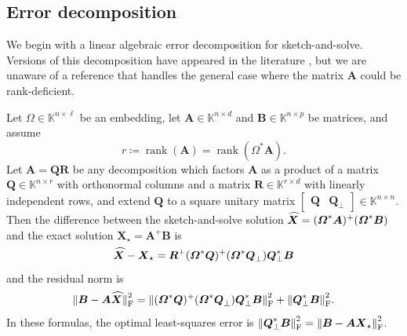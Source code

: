 \documentclass[11pt]{article}
\newcommand{\field}{\mathbb{K}}
\DeclareMathOperator{\rank}{rank}
\newcommand{\mat}[1]{\boldsymbol{#1}}
\newcommand{\norm}[1]{\mleft\| #1 \mright\|}
\newcommand{\hatbold}[1]{%
  \skew{4}\widehat{\smash{\boldsymbol{#1}}\mathstrut}}
\newcommand{\Xhat}{\smash{\hatbold{X}}}
\theoremstyle{definition}
\numberwithin{equation}{section}
\begin{document}
\subsection{Error decomposition} \label{sec:sketch-solve-formula}

We begin with a linear algebraic error decomposition for sketch-and-solve.
Versions of this decomposition have appeared in the literature \cite{TYUC17,CEMT25}, but we are unaware of a reference that handles the general case where the matrix $\mat{A}$ could be rank-deficient.

\begin{lemma} \label{lem:sketch-solve-formula}
    Let $\mat{\varOmega} \in \field^{n\times \ell}$ be an embedding, let $\mat{A} \in \field^{n\times d}$ and $\mat{B} \in \field^{n\times p}$ be matrices, and assume 
    \begin{equation*}
    r \coloneqq \rank(\mat{A}) = \rank(\mat{\varOmega}^* \mat{A}).
    \end{equation*}
    Let $\mat{A} = \mat{Q}\mat{R}$ be any decomposition which factors $\mat{A}$ as a product of a matrix $\mat{Q} \in \field^{n\times r}$ with orthonormal columns and a matrix $\mat{R} \in \field^{r\times d}$ with linearly independent rows, and extend $\mat{Q}$ to a square unitary matrix $[\begin{matrix} \mat{Q} & \mat{Q}_\perp \end{matrix}] \in \field^{n\times n}$.
    Then the difference between the sketch-and-solve solution $\Xhat = (\mat{\varOmega}^*\mat{A})^+(\mat{\varOmega}^*\mat{B})$ and the exact solution $\mat{X}_\star = \mat{A}^+\mat{B}$ is
    \begin{equation} \label{eq:sketch-and-solve-error-decomposition-1}
        \Xhat - \mat{X}_\star = \mat{R}^+ (\mat{\varOmega}^*\mat{Q})^+(\mat{\varOmega}^*\mat{Q}_\perp^{\vphantom{*}}) \mat{Q}_\perp^*\mat{B}
    \end{equation}
    and the residual norm is
    \begin{equation} \label{eq:sketch-and-solve-error-decomposition-2}
        \norm{\mat{B} - \mat{A}\Xhat}_{\rm F}^2 = \norm{\smash{(\mat{\varOmega}^*\mat{Q})^+(\mat{\varOmega}^*\mat{Q}_\perp^{\vphantom{*}}) \mat{Q}_\perp^*\mat{B}}}_{\rm F}^2 + 
        \norm{\mat{Q}_\perp^*\mat{B}}_{\rm F}^2.
    \end{equation}
    In these formulas, the optimal least-squares error is $\norm{\smash{\mat{Q}_\perp^*\mat{B}}}_{\rm F}^2 = \norm{\smash{\mat{B} - \mat{A} \mat{X}_{\star}}}_{\rm F}^2$.
\end{lemma}
\end{document}

